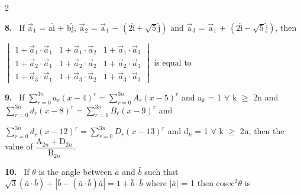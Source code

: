 \documentclass[10pt]{extarticle}
\newcommand{\qn}[1]{\par\smallskip\noindent\textbf{#1.}~}
\begin{document}
\begin{multicols}{2}
\qn{8} If $\vec{\mathrm a}_1$ = a$\hat{\mathrm i}$ + b$\hat{\mathrm j}$, $\vec{\mathrm a}_2$ = $\vec{\mathrm a}_1$ $-$ $\left(2\hat{\mathrm i}+\sqrt5\hat{\mathrm j}\right)$ and $\vec{\mathrm a}_3$ = $\vec{\mathrm a}_1$ + $\left(2\hat{\mathrm i}-\sqrt5\hat{\mathrm j}\right)$, then\par
$\begin{vmatrix}1+\vec a_1\cdot\vec a_1&1+\vec a_1\cdot\vec a_2&1+\vec a_1\cdot\vec a_3\\1+\vec a_2\cdot\vec a_1&1+\vec a_2\cdot\vec a_2&1+\vec a_2\cdot\vec a_3\\1+\vec a_3\cdot\vec a_1&1+\vec a_3\cdot\vec a_2&1+\vec a_3\cdot\vec a_3\end{vmatrix}$ is equal to
\qn{9} If $\displaystyle\sum_{r=0}^{3n}a_r(x-4)^r=\sum_{r=0}^{3n}A_r(x-5)^r$ and a$_k$ = 1 $\forall$ k $\geqslant$ 2n and $\displaystyle\sum_{r=0}^{3n}d_r(x-8)^r=\sum_{r=0}^{3n}B_r(x-9)^r$ and\par
$\displaystyle\sum_{r=0}^{3n}d_r(x-12)^r=\sum_{r=0}^{3n}D_r(x-13)^r$ and d$_k$ = 1 $\forall$ k $\geqslant$ 2n, then the value of $\dfrac{\mathrm A_{2n}+\mathrm D_{2n}}{\mathrm B_{2n}}$.
\qn{10} If $\theta$ is the angle between $\bar a$ and $\bar b$ such that $\sqrt3(\bar a\cdot\bar b)+\left|\bar b-(\bar a\cdot\bar b)\bar a\right|=1+\bar b\cdot\bar b$ where $|\bar a|$ = 1 then cosec$^2\theta$ is
\end{multicols}
\end{document}
